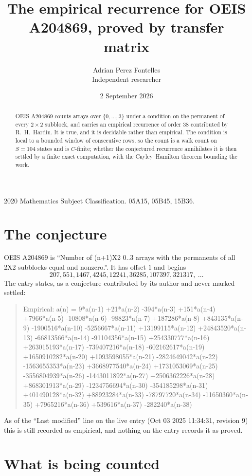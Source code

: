 \documentclass[11pt,a4paper]{article}
\title{The empirical recurrence for OEIS A204869, proved by transfer matrix}
\author{Adrian Perez Fontelles\\ \small Independent researcher}
\date{2 September 2026}
\theoremstyle{plain}
\theoremstyle{definition}
\begin{document}
\maketitle

\begin{abstract}
OEIS A204869 counts arrays over $\{0,\dots,3\}$ under a condition on the permanent of every
$2\times2$ subblock, and carries an empirical recurrence of order $38$ contributed by
R.~H.~Hardin. It is true, and it is decidable rather than empirical. The condition is local to
a bounded window of consecutive rows, so the count is a walk count on $S=104$ states and is
$C$-finite; whether the conjectured recurrence annihilates it is then settled by a finite exact
computation, with the Cayley--Hamilton theorem bounding the work.
\end{abstract}

\noindent\small 2020 Mathematics Subject Classification. 05A15, 05B45, 15B36.\normalsize

\section{The conjecture}

OEIS A204869 is ``Number of (n+1)X2 0..3 arrays with the permanents of all 2X2 subblocks equal and nonzero.''. It has offset $1$ and begins
\[
207, 551, 1467, 4245, 12241, 36285, 107397, 321317,\ \dots
\]
The entry states, as a conjecture contributed by its author and never marked settled:
\begin{quote}
Empirical: a(n) = 9*a(n-1) +21*a(n-2) -394*a(n-3) +151*a(n-4) +7966*a(n-5) -10808*a(n-6) -98823*a(n-7) +187286*a(n-8) +843135*a(n-9) -1900516*a(n-10) -5256667*a(n-11) +13199115*a(n-12) +24843520*a(n-13) -66813566*a(n-14) -91104356*a(n-15) +254330777*a(n-16) +263015193*a(n-17) -739407216*a(n-18) -602162617*a(n-19) +1650910282*a(n-20) +1093598055*a(n-21) -2824649042*a(n-22) -1563655353*a(n-23) +3668977540*a(n-24) +1731053069*a(n-25) -3556804939*a(n-26) -1443011892*a(n-27) +2506362226*a(n-28) +868301913*a(n-29) -1234756694*a(n-30) -354185298*a(n-31) +401490128*a(n-32) +88923284*a(n-33) -78797720*a(n-34) -11650360*a(n-35) +7965216*a(n-36) +539616*a(n-37) -282240*a(n-38)
\end{quote}
As of the ``Last modified'' line on the live entry (Oct 03 2025 11:34:31, revision 9) this is still
recorded as empirical, and nothing on the entry records it as proved.

\section{What is being counted}
\end{document}

